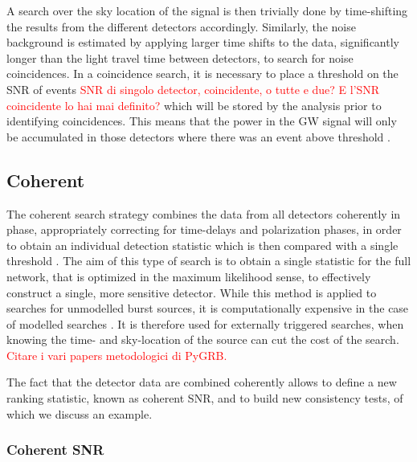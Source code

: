 \documentclass[binding=0.6cm, LaM]{sapthesis}
\newcommand{\fpg}[1]{\textcolor{red}{#1} }
\begin{document}
	A search over the sky location of the signal is then trivially done 
	by time-shifting the results from the different detectors accordingly.
        Similarly, the noise background is estimated by applying larger time shifts to the data,
        significantly longer than the light travel time between detectors, to search for noise coincidences.
        In a coincidence search, it is necessary to place a threshold on the SNR of events \fpg{SNR di singolo detector, coincidente, o tutte e due? E l'SNR coincidente lo hai mai definito?}
        which will be stored by the analysis prior to identifying coincidences.
        This means that the power in the GW signal will only be accumulated
	in those detectors where there was an event above threshold \cite{45}.  

\subsection{Coherent}

	The coherent search strategy combines the data from all detectors coherently in phase, 
	appropriately correcting for time-delays and polarization phases, in order
	to obtain an individual detection statistic which is then compared with a single threshold \cite{18}. 
	The aim of this type of search is to obtain a single statistic for the full 
	network, that is optimized in the maximum likelihood sense, 
	to effectively construct a single, more sensitive detector.
 	While this method is applied to searches for unmodelled burst sources,
        it is computationally expensive in the case of modelled searches \cite{45}.  It is therefore used for externally triggered searches, when knowing the time- and sky-location of the source can cut the cost of the search.  \fpg{Citare i vari papers metodologici di PyGRB.}

        The fact that the detector data are combined coherently allows to define a new ranking statistic, known as coherent SNR, and to build new consistency tests, of which we discuss an example.

\subsubsection{Coherent SNR}
	
\end{document}
